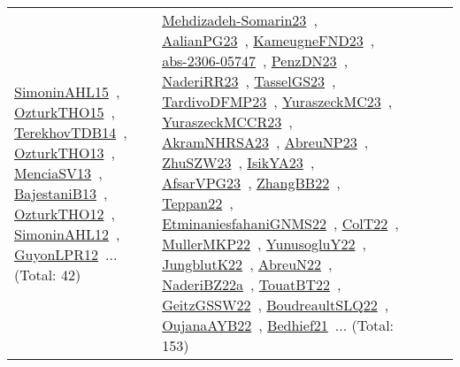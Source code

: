 {\begin{longtable}{lp{3cm}>{\raggedright\arraybackslash}p{6cm}>{\raggedright\arraybackslash}p{6cm}>{\raggedright\arraybackslash}p{8cm}}
\href{../works/SimoninAHL15.pdf}{SimoninAHL15}~\cite{SimoninAHL15}, \href{../works/OzturkTHO15.pdf}{OzturkTHO15}~\cite{OzturkTHO15}, \href{../works/TerekhovTDB14.pdf}{TerekhovTDB14}~\cite{TerekhovTDB14}, \href{../works/OzturkTHO13.pdf}{OzturkTHO13}~\cite{OzturkTHO13}, \href{../works/MenciaSV13.pdf}{MenciaSV13}~\cite{MenciaSV13}, \href{../works/BajestaniB13.pdf}{BajestaniB13}~\cite{BajestaniB13}, \href{../works/OzturkTHO12.pdf}{OzturkTHO12}~\cite{OzturkTHO12}, \href{../works/SimoninAHL12.pdf}{SimoninAHL12}~\cite{SimoninAHL12}, \href{../works/GuyonLPR12.pdf}{GuyonLPR12}~\cite{GuyonLPR12}... (Total: 42) & \href{../works/Mehdizadeh-Somarin23.pdf}{Mehdizadeh-Somarin23}~\cite{Mehdizadeh-Somarin23}, \href{../works/AalianPG23.pdf}{AalianPG23}~\cite{AalianPG23}, \href{../works/KameugneFND23.pdf}{KameugneFND23}~\cite{KameugneFND23}, \href{../works/abs-2306-05747.pdf}{abs-2306-05747}~\cite{abs-2306-05747}, \href{../works/PenzDN23.pdf}{PenzDN23}~\cite{PenzDN23}, \href{../works/NaderiRR23.pdf}{NaderiRR23}~\cite{NaderiRR23}, \href{../works/TasselGS23.pdf}{TasselGS23}~\cite{TasselGS23}, \href{../works/TardivoDFMP23.pdf}{TardivoDFMP23}~\cite{TardivoDFMP23}, \href{../works/YuraszeckMC23.pdf}{YuraszeckMC23}~\cite{YuraszeckMC23}, \href{../works/YuraszeckMCCR23.pdf}{YuraszeckMCCR23}~\cite{YuraszeckMCCR23}, \href{../works/AkramNHRSA23.pdf}{AkramNHRSA23}~\cite{AkramNHRSA23}, \href{../works/AbreuNP23.pdf}{AbreuNP23}~\cite{AbreuNP23}, \href{../works/ZhuSZW23.pdf}{ZhuSZW23}~\cite{ZhuSZW23}, \href{../works/IsikYA23.pdf}{IsikYA23}~\cite{IsikYA23}, \href{../works/AfsarVPG23.pdf}{AfsarVPG23}~\cite{AfsarVPG23}, \href{../works/ZhangBB22.pdf}{ZhangBB22}~\cite{ZhangBB22}, \href{../works/Teppan22.pdf}{Teppan22}~\cite{Teppan22}, \href{../works/EtminaniesfahaniGNMS22.pdf}{EtminaniesfahaniGNMS22}~\cite{EtminaniesfahaniGNMS22}, \href{../works/ColT22.pdf}{ColT22}~\cite{ColT22}, \href{../works/MullerMKP22.pdf}{MullerMKP22}~\cite{MullerMKP22}, \href{../works/YunusogluY22.pdf}{YunusogluY22}~\cite{YunusogluY22}, \href{../works/JungblutK22.pdf}{JungblutK22}~\cite{JungblutK22}, \href{../works/AbreuN22.pdf}{AbreuN22}~\cite{AbreuN22}, \href{../works/NaderiBZ22a.pdf}{NaderiBZ22a}~\cite{NaderiBZ22a}, \href{../works/TouatBT22.pdf}{TouatBT22}~\cite{TouatBT22}, \href{../works/GeitzGSSW22.pdf}{GeitzGSSW22}~\cite{GeitzGSSW22}, \href{../works/BoudreaultSLQ22.pdf}{BoudreaultSLQ22}~\cite{BoudreaultSLQ22}, \href{../works/OujanaAYB22.pdf}{OujanaAYB22}~\cite{OujanaAYB22}, \href{../works/Bedhief21.pdf}{Bedhief21}~\cite{Bedhief21}... (Total: 153)\\

\end{longtable}}
